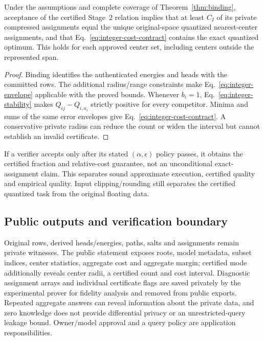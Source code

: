 \begin{corollary}\label{cor:certified-audit}
Under the assumptions and complete coverage of Theorem~\ref{thm:binding}, acceptance of the certified Stage~2 relation implies that at least $C_I$ of its private compressed assignments equal the unique original-space quantized nearest-center assignments, and that Eq.~\eqref{eq:integer-cost-contract} contains the exact quantized optimum. This holds for each approved center set, including centers outside the represented span.
\end{corollary}
\begin{proof}
Binding identifies the authenticated energies and heads with the committed rows. The additional radius/range constraints make Eq.~\eqref{eq:integer-envelope} applicable with the proved bounds. Whenever $b_i=1$, Eq.~\eqref{eq:integer-stability} makes $Q_{ij}-Q_{i,a_i}$ strictly positive for every competitor. Minima and sums of the same error envelopes give Eq.~\eqref{eq:integer-cost-contract}. A conservative private radius can reduce the count or widen the interval but cannot establish an invalid certificate.
\end{proof}
If a verifier accepts only after its stated $(\alpha,\epsilon)$ policy passes, it obtains the certified fraction and relative-cost guarantee, not an unconditional exact-assignment claim. This separates sound approximate execution, certified quality and empirical quality. Input clipping/rounding still separates the certified quantized task from the original floating data.

\subsection{Public outputs and verification boundary}
Original rows, derived heads/energies, paths, salts and assignments remain private witnesses. The public statement exposes roots, model metadata, subset indices, center statistics, aggregate cost and aggregate margin; certified mode additionally reveals center radii, a certified count and cost interval. Diagnostic assignment arrays and individual certificate flags are saved privately by the experimental prover for fidelity analysis and removed from public exports. Repeated aggregate answers can reveal information about the private data, and zero knowledge does not provide differential privacy or an unrestricted-query leakage bound. Owner/model approval and a query policy are application responsibilities.

